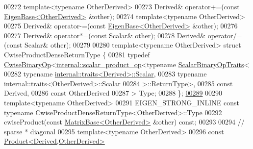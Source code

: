 \begin{DoxyCode}
00272     \textcolor{keyword}{template}<\textcolor{keyword}{typename} OtherDerived>
00273     Derived& operator+=(\textcolor{keyword}{const} \hyperlink{group___core___module_struct_eigen_1_1_eigen_base}{EigenBase<OtherDerived>} &other);
00274     \textcolor{keyword}{template}<\textcolor{keyword}{typename} OtherDerived>
00275     Derived& operator-=(\textcolor{keyword}{const} \hyperlink{group___core___module_struct_eigen_1_1_eigen_base}{EigenBase<OtherDerived>} &other);
00276 
00277     Derived& operator*=(\textcolor{keyword}{const} Scalar& other);
00278     Derived& operator/=(\textcolor{keyword}{const} Scalar& other);
00279 
00280     \textcolor{keyword}{template}<\textcolor{keyword}{typename} OtherDerived> \textcolor{keyword}{struct }CwiseProductDenseReturnType \{
00281       \textcolor{keyword}{typedef} \hyperlink{group___core___module_class_eigen_1_1_cwise_binary_op}{CwiseBinaryOp}<\hyperlink{struct_eigen_1_1internal_1_1scalar__product__op}{internal::scalar\_product\_op}<\textcolor{keyword}{typename} 
      \hyperlink{group___core___module_struct_eigen_1_1_scalar_binary_op_traits}{ScalarBinaryOpTraits}<
00282                                                           \textcolor{keyword}{typename} 
      \hyperlink{struct_eigen_1_1internal_1_1traits}{internal::traits<Derived>::Scalar},
00283                                                           \textcolor{keyword}{typename} 
      \hyperlink{struct_eigen_1_1internal_1_1traits}{internal::traits<OtherDerived>::Scalar}
00284                                                         >::ReturnType>,
00285                             \textcolor{keyword}{const} Derived,
00286                             \textcolor{keyword}{const} OtherDerived
00287                           > Type;
00288     \};
\hyperlink{group___sparse_core___module_a3f810c062c1bc3cad4ae82be15c15636}{00289} 
00290     \textcolor{keyword}{template}<\textcolor{keyword}{typename} OtherDerived>
00291     EIGEN\_STRONG\_INLINE \textcolor{keyword}{const} \textcolor{keyword}{typename} CwiseProductDenseReturnType<OtherDerived>::Type
00292     cwiseProduct(\textcolor{keyword}{const} \hyperlink{group___core___module_class_eigen_1_1_matrix_base}{MatrixBase<OtherDerived>} &other) \textcolor{keyword}{const};
00293 
00294     \textcolor{comment}{// sparse * diagonal}
00295     \textcolor{keyword}{template}<\textcolor{keyword}{typename} OtherDerived>
00296     \textcolor{keyword}{const} \hyperlink{group___core___module_class_eigen_1_1_product}{Product<Derived,OtherDerived>}

\end{DoxyCode}

